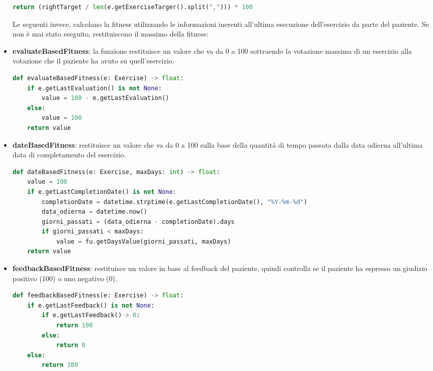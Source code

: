 \documentclass{article}
\begin{document}
\begin{itemize}
\begin{lstlisting}[language = Python]
    return (rightTarget / len(e.getExerciseTarger().split(","))) * 100
\end{lstlisting}

\pagebreak

Le seguenti invece, calcolano la fitness utilizzando le informazioni inerenti all'ultima esecuzione dell'esercizio da parte del paziente. Se non è mai stato eseguito, restituiscono il massimo della fitness:


\item\textbf{evaluateBasedFitness}: la funzione restituisce un valore che va da 0 a 100 sottraendo la votazione massima di un esercizio alla votazione che il paziente ha avuto su quell'esercizio.
\begin{lstlisting}[language = Python]
    def evaluateBasedFitness(e: Exercise) -> float:
    if e.getLastEvaluation() is not None:
        value = 100 - e.getLastEvaluation()
    else:
        value = 100
    return value
\end{lstlisting}

\item\textbf{dateBasedFitness}: restituisce un valore che va da 0 a 100 sulla base della quantità di tempo passata dalla data odierna all'ultima data di completamento del esercizio.
\begin{lstlisting}[language = Python]
    def dateBasedFitness(e: Exercise, maxDays: int) -> float:
    value = 100
    if e.getLastCompletionDate() is not None:
        completionDate = datetime.strptime(e.getLastCompletionDate(), "%Y-%m-%d")
        data_odierna = datetime.now()
        giorni_passati = (data_odierna - completionDate).days
        if giorni_passati < maxDays:
            value = fu.getDaysValue(giorni_passati, maxDays)
    return value
\end{lstlisting}


\item\textbf{feedbackBasedFitness}: restituisce un valore in base al feedback del paziente, quindi controlla se il paziente ha espresso un giudizio positivo (100) o uno negativo (0).
\begin{lstlisting}[language = Python]
    def feedbackBasedFitness(e: Exercise) -> float:
    if e.getLastFeedback() is not None:
        if e.getLastFeedback() > 0:
            return 100
        else:
            return 0
    else:
        return 100
\end{lstlisting}


\end{itemize}
\end{document}
